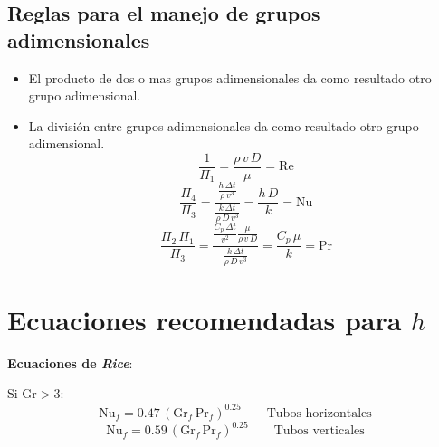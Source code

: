 \subsection{Reglas para el manejo de grupos adimensionales}
\begin{itemize}
    \item El producto de dos o mas grupos adimensionales da como resultado otro
        grupo adimensional.
    \item La división entre grupos adimensionales da como resultado otro grupo
        adimensional.
        \begin{equation*}
            \frac{1}{\Pi_1} = \frac{\rho\,v\,D}{\mu} = \text{Re}
        \end{equation*}
        \begin{equation*}
            \frac{\Pi_4}{\Pi_3}
                = \dfrac{\frac{h\,\Delta{t}}{\rho\,v^3}}
                    {\frac{k\,\Delta{t}}{\rho\,D\,v^3}}
                = \frac{h\,D}{k}
                = \text{Nu}
        \end{equation*}
        \begin{equation*}
            \frac{\Pi_2\,\Pi_1}{\Pi_3}
                = \dfrac{\frac{C_p\,\Delta{t}}{v^2}\frac{\mu}{\rho\,v\,D}}
                    {\frac{k\,\Delta{t}}{\rho\,D\,v^3}}
                = \frac{C_p\,\mu}{k}
                = \text{Pr}
        \end{equation*}
\end{itemize}

\section{Ecuaciones recomendadas para $h$}

\textbf{Ecuaciones de \emph{Rice}}:

Si $\text{Gr} > 3$:
\begin{equation}
    \text{Nu}_f = 0.47\,(\text{Gr}_f\,\text{Pr}_f)^{0.25}
    \qquad\text{Tubos horizontales}
\end{equation}
\begin{equation}
    \text{Nu}_f = 0.59\,(\text{Gr}_f\,\text{Pr}_f)^{0.25}
    \qquad\text{Tubos verticales}
\end{equation}

